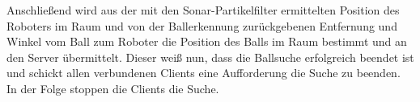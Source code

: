 Anschließend wird aus der mit den Sonar-Partikelfilter ermittelten
Position des Roboters im Raum und von der Ballerkennung zurückgebenen
Entfernung und Winkel vom Ball zum Roboter die Position des Balls im
Raum bestimmt und an den Server übermittelt. Dieser weiß nun, dass die
Ballsuche erfolgreich beendet ist und schickt allen verbundenen
Clients eine Aufforderung die Suche zu beenden. In der Folge stoppen
die Clients die Suche.

